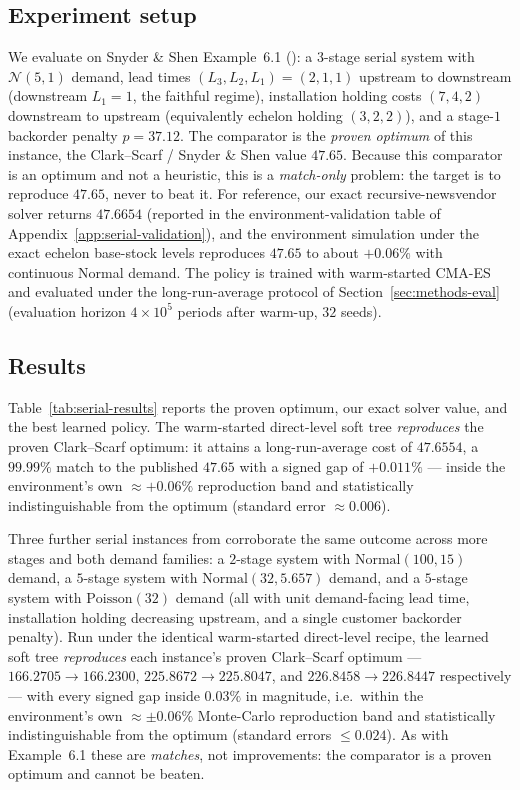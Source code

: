 \documentclass[11pt]{article}
\begin{document}
\subsection{Experiment setup}

We evaluate on Snyder \& Shen Example~6.1 (\citealp{snyder2019foundations}):
a $3$-stage serial system with $\mathcal N(5,1)$ demand, lead times
$(L_3,L_2,L_1)=(2,1,1)$ upstream to downstream (downstream $L_1=1$, the faithful regime), installation
holding costs $(7,4,2)$ downstream to upstream (equivalently echelon holding $(3,2,2)$), and a
stage-$1$ backorder penalty $p=37.12$. The comparator is the \emph{proven optimum} of this instance,
the Clark--Scarf / Snyder \& Shen value $47.65$. Because this comparator is an optimum and not a
heuristic, this is a \emph{match-only} problem: the target is to reproduce $47.65$, never to beat it.
For reference, our exact recursive-newsvendor solver returns $47.6654$
(reported in the environment-validation table of Appendix~\ref{app:serial-validation}), and the
environment simulation under the exact echelon base-stock levels reproduces $47.65$ to about $+0.06\%$
with continuous Normal demand. The policy is trained with
warm-started CMA-ES and evaluated under the long-run-average protocol of
Section~\ref{sec:methods-eval} (evaluation horizon $4\times10^5$ periods after warm-up, $32$ seeds).

\subsection{Results}

Table~\ref{tab:serial-results} reports the proven optimum, our exact solver value, and the
best learned policy. The warm-started direct-level soft tree \emph{reproduces} the proven Clark--Scarf
optimum: it attains a long-run-average cost of $47.6554$, a $99.99\%$ match to the published $47.65$
with a signed gap of $+0.011\%$ --- inside the environment's own $\approx{+}0.06\%$ reproduction band
and statistically indistinguishable from the optimum (standard error $\approx0.006$).

Three further serial instances from \citet{snyder2019foundations} corroborate the same outcome across
more stages and both demand families: a $2$-stage system with $\mathrm{Normal}(100,15)$ demand, a
$5$-stage system with $\mathrm{Normal}(32,5.657)$ demand, and a $5$-stage system with
$\mathrm{Poisson}(32)$ demand (all with unit demand-facing lead time, installation holding decreasing
upstream, and a single customer backorder penalty). Run under the
identical warm-started direct-level recipe, the learned soft tree \emph{reproduces} each instance's
proven Clark--Scarf optimum --- $166.2705 \to 166.2300$, $225.8672 \to 225.8047$, and
$226.8458 \to 226.8447$ respectively --- with every signed gap inside $0.03\%$ in magnitude, i.e.\
within the environment's own $\approx{\pm}0.06\%$ Monte-Carlo reproduction band and statistically
indistinguishable from the optimum (standard errors $\le 0.024$). As with Example~6.1 these are
\emph{matches}, not improvements: the comparator is a proven optimum and cannot be beaten.
\end{document}
